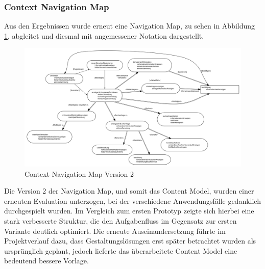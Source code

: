 \subsubsection{Context Navigation Map}
Aus den Ergebnissen wurde erneut eine Navigation Map, zu sehen in Abbildung \ref{fig:navigationmap2}, abgleitet und diesmal mit angemessener Notation dargestellt.
\begin{figure}[H]
\includegraphics[width=1\textwidth]{./images/navigationmap2.png}
\caption{Context Navigation Map Version 2}
\label{fig:navigationmap2}
\end{figure}

Die Version 2 der Navigation Map, und somit das Content Model, wurden einer erneuten Evaluation unterzogen, bei der verschiedene Anwendungsfälle gedanklich durchgespielt wurden. Im Vergleich zum ersten Prototyp zeigte sich hierbei eine stark verbesserte Struktur, die den Aufgabenfluss im Gegensatz zur ersten Variante deutlich optimiert. Die erneute Auseinandersetzung führte im Projektverlauf dazu, dass Gestaltungslösungen erst später betrachtet wurden als ursprünglich geplant, jedoch lieferte das überarbeitete Content Model eine bedeutend bessere Vorlage.



